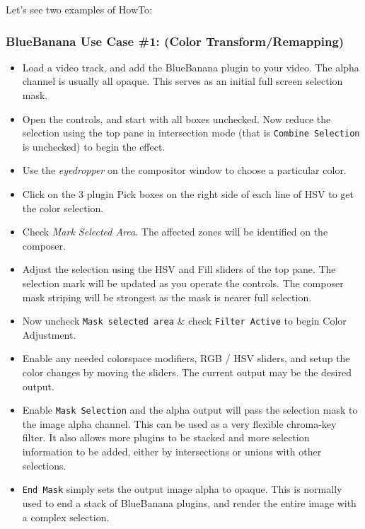 Let's see two examples of HowTo:


\subsubsection*{BlueBanana Use Case \#1: (Color Transform/Remapping)}
\label{ssub:bb_use_case_1}

\begin{itemize}
        \item Load a video track, and add the BlueBanana plugin to your video. The alpha channel is usually all opaque. This serves as an initial full screen selection mask.
        \item Open the controls, and start with all boxes unchecked. Now reduce the selection using the top pane in intersection mode (that is \texttt{Combine Selection} is unchecked) to begin the effect.
        \item Use the \textit{eyedropper} on the compositor window to choose a particular color.
        \item Click on the 3 plugin Pick boxes on the right side of each line of HSV to get the color selection.
        \item Check \textit{Mark Selected Area}. The affected zones will be identified on the composer.
        \item Adjust the selection using the HSV and Fill sliders of the top pane. The selection mark will be updated as you operate the controls. The composer mask striping will be strongest as the mask is nearer full selection.
        \item Now uncheck \texttt{Mask selected area} \& check \texttt{Filter Active} to begin Color Adjustment.
        \item Enable any needed colorspace modifiers, RGB / HSV sliders, and setup the color changes by moving the sliders. The current output may be the desired output.
        \item Enable \texttt{Mask Selection} and the alpha output will pass the selection mask to the image alpha channel. This can be used as a very flexible chroma-key filter. It also allows more plugins to be stacked and more selection information to be added, either by intersections or unions with other selections.
        \item \texttt{End Mask} simply sets the output image alpha to opaque. This is normally used to end a stack of BlueBanana plugins, and render the entire image with a complex selection.
\end{itemize}


